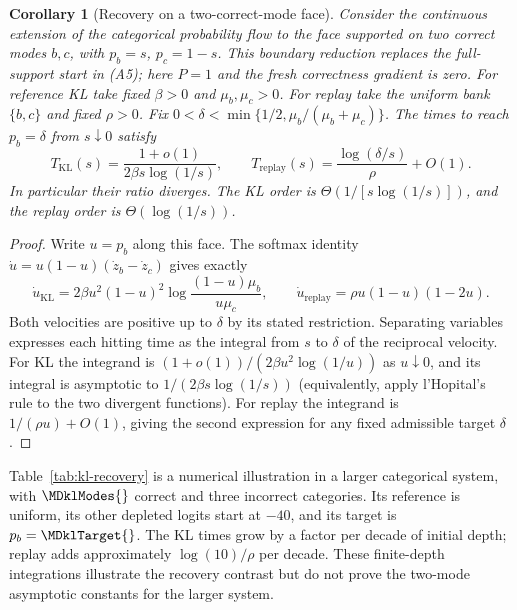 \documentclass{article}
\newcommand{\enforcehalffinalproseline}{%
  \setlength{\parfillskip}{0pt plus .20\linewidth}}
\newcommand{\1}{\mathbf 1}
\newtheorem{corollary}[lemma]{Corollary}
\theoremstyle{remark}
\theoremstyle{definition}
\theoremstyle{plain}
\begin{document}
\begin{corollary}[Recovery on a two-correct-mode face]
\enforcehalffinalproseline
\label{cor:kl-recovery-time}
Consider the continuous extension of the categorical probability flow to
the face supported on two correct modes $b,c$, with $p_b=s$, $p_c=1-s$.
This boundary reduction replaces the full-support start in (A5); here $P=1$
and the fresh correctness gradient is zero. For reference KL take fixed
$\beta>0$ and $\mu_b,\mu_c>0$. For replay take the uniform bank $\{b,c\}$
and fixed $\rho>0$. Fix
$0<\delta<\min\{1/2,\mu_b/(\mu_b+\mu_c)\}$.
The times to reach $p_b=\delta$ from $s\downarrow0$ satisfy
\[
 T_{\mathrm{KL}}(s)
 =\frac{1+o(1)}{2\beta s\log(1/s)},\qquad
 T_{\mathrm{replay}}(s)
 =\frac{\log(\delta/s)}{\rho}+O(1).
\]
In particular their ratio diverges. The KL order is
$\Theta(1/[s\log(1/s)])$, and the replay order is
$\Theta(\log(1/s))$.
\end{corollary}
\begin{proof}
\enforcehalffinalproseline
Write $u=p_b$ along this face. The softmax identity
$\dot u=u(1-u)(\dot z_b-\dot z_c)$ gives exactly
\[
 \dot u_{\mathrm{KL}}
 =2\beta u^2(1-u)^2\log\frac{(1-u)\mu_b}{u\mu_c},
 \qquad
 \dot u_{\mathrm{replay}}
 =\rho u(1-u)(1-2u).
\]
Both velocities are positive up to $\delta$ by its stated restriction.
Separating variables expresses each hitting time as the integral from
$s$ to $\delta$ of the reciprocal velocity. For KL the integrand is
$(1+o(1))/(2\beta u^2\log(1/u))$ as $u\downarrow0$, and its integral is
asymptotic to $1/(2\beta s\log(1/s))$ (equivalently, apply
l'Hopital's rule to the two divergent functions). For replay the integrand
is $1/(\rho u)+O(1)$, giving the second expression for any fixed admissible target $\delta$.
\end{proof}

Table~\ref{tab:kl-recovery} is a numerical illustration in a larger
categorical system, with $\MDklModes{}$ correct and three incorrect categories.
Its reference is uniform, its other depleted logits start at $-40$, and its
target is $p_b=\MDklTarget{}$. The KL times grow by a factor
\MDklDecadeKL{} per decade of initial depth; replay adds approximately
$\log(10)/\rho$ per decade. These finite-depth integrations illustrate the
recovery contrast but do not prove the two-mode asymptotic constants for
the larger system.
\end{document}
